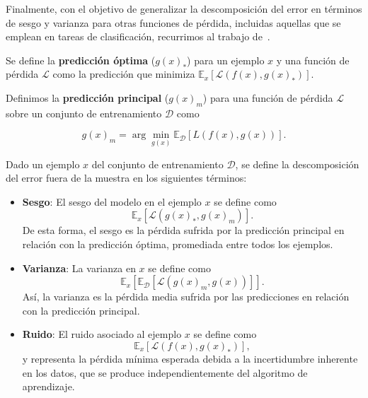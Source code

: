 Finalmente, con el objetivo de generalizar la descomposición del error en términos de sesgo y varianza para otras funciones de pérdida, incluidas aquellas que se emplean en tareas de clasificación, recurrimos al trabajo de~\cite{Domingos2000}.

\begin{definicion}
    Se define la \textbf{predicción óptima} ($g(x)_{*}$) para un ejemplo $x$ y una función de pérdida $\mathcal{L}$ como la predicción que minimiza $\mathbb{E}_{x}[\mathcal{L}(f(x), g(x)_{*})]$.
\end{definicion}

\begin{definicion}
    Definimos la \textbf{predicción principal} ($g(x)_{m}$) para una función de pérdida $\mathcal{L}$ sobre un conjunto de entrenamiento $\mathcal{D}$ como

    \[
        g(x)_{m} = \arg\min_{g(x)} \mathbb{E}_{\mathcal{D}}[L(f(x), g(x))].
    \]
\end{definicion}

\begin{definicion}
    Dado un ejemplo $x$ del conjunto de entrenamiento $\mathcal{D}$, se define la descomposición del error fuera de la muestra en los siguientes términos:
    
    \begin{itemize}
        \item \textbf{Sesgo}: El sesgo del modelo en el ejemplo $x$ se define como
        \[
            \mathbb{E}_{x}[\mathcal{L}(g(x)_{*}, g(x)_{m})].
        \]
        De esta forma, el sesgo es la pérdida sufrida por la predicción principal en relación con la predicción óptima, promediada entre todos los ejemplos.
    
        \item \textbf{Varianza}: La varianza en $x$ se define como
        \[
            \mathbb{E}_{x}[\mathbb{E}_{\mathcal{D}}[\mathcal{L}(g(x)_{m}, g(x))]].
        \]
        Así, la varianza es la pérdida media sufrida por las predicciones en relación con la predicción principal.
    
        \item \textbf{Ruido}: El ruido asociado al ejemplo $x$ se define como
        \[
            \mathbb{E}_{x}[\mathcal{L}(f(x), g(x)_{*})],
        \]
        y representa la pérdida mínima esperada debida a la incertidumbre inherente en los datos, que se produce independientemente del algoritmo de aprendizaje.
    \end{itemize}
\end{definicion}

